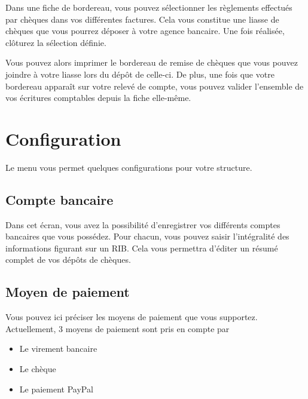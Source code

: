 \documentclass[a4paper,10pt,oneside,french]{sphinxmanual}
\begin{document}
Dans une fiche de bordereau, vous pouvez sélectionner les règlements effectués par chèques dans vos différentes factures.
Cela vous constitue une liasse de chèques que vous pourrez déposer à votre agence bancaire.
Une fois réalisée, clôturez la sélection définie.
\begin{quote}

\noindent{}
\end{quote}

Vous pouvez alors imprimer le bordereau de remise de chèques que vous pouvez joindre à votre liasse lors du dépôt de celle-ci.
De plus, une fois que votre bordereau apparaît sur votre relevé de compte, vous pouvez valider l’ensemble de vos écritures comptables depuis la fiche elle-même.


\section{Configuration}
\label{\detokenize{payoff/config:configuration}}\label{\detokenize{payoff/config::doc}}
Le menu  vous permet quelques configurations pour votre structure.


\subsection{Compte bancaire}
\label{\detokenize{payoff/config:compte-bancaire}}
Dans cet écran, vous avez la possibilité d’enregistrer vos différents comptes bancaires que vous possédez.
Pour chacun, vous pouvez saisir l’intégralité des informations figurant sur un RIB.
Cela vous permettra d’éditer un résumé complet de vos dépôts de chèques.


\subsection{Moyen de paiement}
\label{\detokenize{payoff/config:moyen-de-paiement}}
Vous pouvez ici préciser les moyens de paiement que vous supportez.
Actuellement, 3 moyens de paiement sont pris en compte par 
\begin{itemize}
\item {} 
Le virement bancaire

\item {} 
Le chèque

\item {} 
Le paiement PayPal

\end{itemize}
\end{document}
